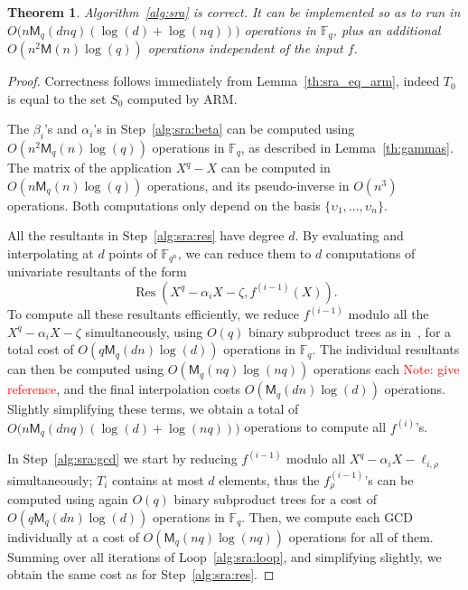 \documentclass{article}
\newcommand{\ff}[1]{\mathbb{F}_{#1}}
\newcommand{\qq}{q}
\newcommand{\nn}{n}
\newcommand{\qn}{{\qq^\nn}}
\newcommand{\basef}{\ff{\qq}}
\newcommand{\extf}{\ff{\qn}}
\newcommand{\Mul}{\mathsf{M}}
\DeclareMathOperator{\Res}{Res}
\newtheorem{Theo}{Theorem}
\newcommand{\Notes}[1]{\textcolor{red}{Note: #1}}
\begin{document}
\begin{Theo}
  \label{th:sra}
  Algorithm~\ref{alg:sra} is correct. It can be implemented so as to
  run in $O\bigl(n\Mul_q(dnq)(\log(d) + \log(nq))\bigr)$ operations in
  $\basef$, plus an additional $O(n^2\Mul(n)\log(q))$ operations
  independent of the input $f$.
\end{Theo}
\begin{proof}
  Correctness follows immediately from Lemma~\ref{th:sra_eq_arm},
  indeed $T_0$ is equal to the set $S_0$ computed by ARM.
  
  The $\beta_i$'s and $\alpha_i$'s in Step~\ref{alg:sra:beta} can be
  computed using $O(n^2\Mul_q(n)\log(q))$ operations in $\basef$, as
  described in Lemma~\ref{th:gammas}. The matrix of the application
  $X^q-X$ can be computed in $O(n\Mul_q(n)\log(q))$ operations, and
  its pseudo-inverse in $O(n^3)$ operations. Both computations only
  depend on the basis $\{\upsilon_1,\dots,\upsilon_n\}$.

  All the resultants in Step~\ref{alg:sra:res} have degree $d$. %
  By evaluating and interpolating at $d$ points of $\extf$, we can
  reduce them to $d$ computations of univariate resultants of the form
  \[\Res(X^q - \alpha_iX - \zeta, f^{(i-1)}(X)).\]
  To compute all these resultants efficiently, we reduce $f^{(i-1)}$
  modulo all the $X^q-\alpha_iX-\zeta$ simultaneously, using $O(q)$
  binary subproduct trees as in~\cite[Lemma~10.4]{Gathen2003}, for a
  total cost of $O(q\Mul_q(dn)\log(d))$ operations in $\basef$. %
  The individual resultants can then be computed using
  $O(\Mul_q(nq)\log(nq))$ operations each \Notes{give reference}, and
  the final interpolation costs $O(\Mul_q(dn)\log(d))$ operations. %
  Slightly simplifying these terms, we obtain a total of
  $O\bigl(n\Mul_q(dnq)(\log(d) + \log(nq))\bigr)$ operations to
  compute all $f^{(i)}$'s.

  In Step~\ref{alg:sra:gcd} we start by reducing $f^{(i-1)}$ modulo
  all $X^{q}-\alpha_iX-\ell_{i,\rho}$ simultaneously; $T_i$ contains
  at most $d$ elements, thus the $f_\rho^{(i-1)}$'s can be computed
  using again $O(q)$ binary subproduct trees for a cost of
  $O(q\Mul_q(dn)\log(d))$ operations in $\basef$. %
  Then, we compute each GCD individually at a cost of
  $O(\Mul_q(nq)\log(nq))$ operations for all of them. %
  Summing over all iterations of Loop~\ref{alg:sra:loop}, and
  simplifying slightly, we obtain the same cost as for
  Step~\ref{alg:sra:res}.


\end{proof}
\end{document}
